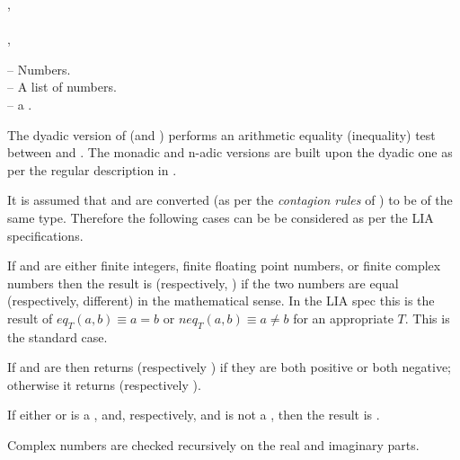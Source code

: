 \documentclass[../Comparisons-Predicates.tex]{subfiles}
\begin{document}
\index{*!\code{=}}
\index{*!\code{/=}}

\DSyntax{}

\code{=} ,  \RArrow {}\\
\code{=}    \RArrow {}\\
\code{/=} ,  \RArrow {}\\
\code{/=}    \RArrow {}

\DArgsNValues{}

  -- Numbers.\\
 -- A list of numbers.\\
 -- a .

\DDescription{}

The dyadic version of \code{=} (and \code{/=}) performs an arithmetic
equality (inequality) test between  and .  The
monadic and n-adic versions are built upon the dyadic one as per the
regular \CL{} description in \cite{1996:ANSIHyperSpec}.

It is assumed that  and  are converted (as per
the \emph{contagion rules} of \CL{}) to be of the same type.
Therefore the following cases can be be considered as per the LIA
specifications.

\begin{description}
\item If  and  are either finite integers, finite
  floating point numbers, or finite complex numbers then the result is
   (respectively, ) if the two numbers are
  equal (respectively, different) in the mathematical sense.  In the
  LIA spec this is the result of $\mathit{eq}_T(a, b) \equiv a = b$ or
  $\mathit{neq}_T(a, b) \equiv a \neq b$ for an
  appropriate $T$.  This is the standard \CL{} case.
  
\item If  and  are  then
  \code{=} returns  (respectively ) if they
  are both positive or both negative; otherwise it returns
   (respectively ).
  
\item If either  or  is a ,
  and, respectively,  and  is not a
  , then the result is .
  
\item Complex numbers are checked recursively on the real and imaginary
  parts.
\end{description}
\end{document}
